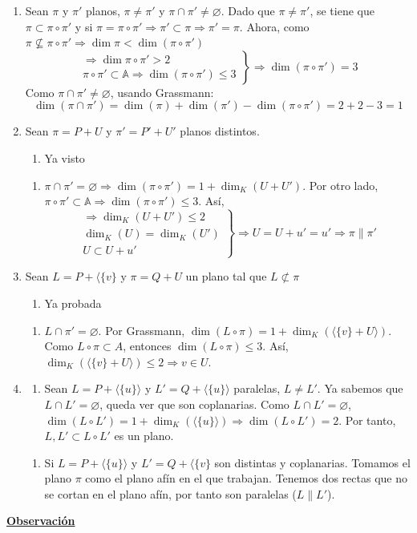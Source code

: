 \documentclass[12pt, a4paper, ones, notitlepage, openany,titlepage]{article}
\newcommand{\dobleimplicacion}[2]{
	\begin{enumerate}[label=$\Rightarrow/$]
		\item #1
	\end{enumerate}
	\begin{enumerate}[label=$\Leftarrow/$]
		\item #2
	\end{enumerate}
}
\newcommand{\observacion}{\noindent\underline{\textbf{Observación}}}
\begin{document}
\begin{enumerate}[label=(\alph*)]
	\item Sean $\pi$ y $\pi'$ planos, $\pi \neq \pi'$ y $\pi \cap \pi' \neq \varnothing$. Dado que $\pi \neq \pi'$, se tiene que $\pi \subset \pi \circ \pi'$ y si $\pi = \pi \circ \pi' \Longrightarrow \pi' \subset \pi \Longrightarrow \pi' = \pi$. Ahora, como $\pi \not\subseteq \pi \circ \pi' \Longrightarrow \dim \pi < \dim(\pi \circ \pi')$
	$$
	\left. \begin{array}{r}
		\Longrightarrow \dim \pi \circ \pi' > 2 \\
		\pi \circ \pi' \subset \mathbb{A} \Longrightarrow \dim(\pi \circ \pi') \le 3
	\end{array} \right\} \Longrightarrow \dim(\pi \circ \pi') = 3
	$$
	Como $\pi \cap \pi' \neq \varnothing$, usando Grassmann:
	$$
	\dim(\pi \cap \pi') = \dim(\pi) + \dim(\pi') - \dim(\pi \circ \pi') = 2 + 2 - 3 = 1
	$$
	
	\item Sean $\pi = P + U$ y $\pi' = P' + U'$ planos distintos.
	\dobleimplicacion{Ya visto}{
	$\pi \cap \pi' = \varnothing \Longrightarrow \dim(\pi \circ \pi') = 1 + \dim_K (U + U')$. Por otro lado, $\pi \circ \pi' \subset \mathbb{A} \Longrightarrow \dim(\pi \circ \pi') \le 3$. Así,
	$$
	\left. \begin{array}{r}
		\Longrightarrow \dim_K (U + U') \le 2 \\
		\dim_K (U) = \dim_K (U') \\
		U \subset U + u'
	\end{array} \right\} \Longrightarrow U = U + u' = u' \Longrightarrow \pi \| \pi'
	$$}
	
	\item Sean $L = P + \langle\{v\}$ y $\pi = Q + U$ un plano tal que $L \not\subset \pi$
	\dobleimplicacion{Ya probada}{
	$L \cap \pi' = \varnothing$. Por Grassmann, $\dim (L \circ \pi) = 1 + \dim_K (\langle\{v\} + U \rangle)$. Como $L \circ \pi \subset A$, entonces $\dim (L \circ \pi) \le 3$. Así, $\dim_K (\langle\{v\} + U \rangle) \le 2 \Longrightarrow v \in U$.
	}
	
	\item
	\dobleimplicacion
	{Sean $L = P + \langle\{u\}\rangle$ y $L' = Q + \langle\{u\}\rangle$ paralelas, $L \neq L'$. Ya sabemos que $L \cap L' = \varnothing$, queda ver que son coplanarias. Como $L \cap L' = \varnothing$, $\dim (L \circ L') = 1 + \dim_K (\langle \{u\} \rangle) \Longrightarrow \dim (L \circ L') = 2$. Por tanto, $L, L' \subset L \circ L'$ es un plano.}
	{Si $L = P + \langle\{u\}\rangle$ y $L' = Q + \langle\{v\}$ son distintas y coplanarias. Tomamos el plano $\pi$ como el plano afín en el que trabajan. Tenemos dos rectas que no se cortan en el plano afín, por tanto son paralelas ($L\|L'$).}
\end{enumerate}
\observacion
\end{document}
